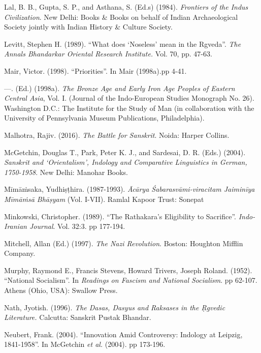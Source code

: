 \begin{thebibliography}{99}
  Lal, B. B., Gupta, S. P., and Asthana, S. (Ed.s) (1984).\textit{ Frontiers of the Indus Civilization}. New Delhi: Books \& Books on behalf of Indian Archaeological Society jointly with Indian History \& Culture Society.

  Levitt, Stephen H. (1989). “What does ‘Noseless’ mean in the Rgveda”. \textit{The Annals Bhandarkar Oriental Research Institute.} Vol. 70, pp. 47-63.

  Mair, Victor. (1998). “Priorities”. In Mair (1998a).pp 4-41.

  —. (Ed.) (1998a). \textit{The Bronze Age and Early Iron Age Peoples of Eastern Central Asia}, Vol. I. (Journal of the Indo-European Studies Monograph No. 26). Washington D.C.: The Institute for the Study of Man (in collaboration with the University of Pennsylvania Museum Publications, Philadelphia).

  Malhotra, Rajiv. (2016). \textit{The Battle for Sanskrit}. Noida: Harper Collins.

  McGetchin, Douglas T., Park, Peter K. J., and Sardesai, D. R. (Eds.) (2004). \textit{Sanskrit and ‘Orientalism’, Indology and Comparative Linguistics in German, 1750-1958}. New Delhi: Manohar Books.

  Mīmāṁsaka, Yudhiṣṭhira. (1987-1993). \textit{Ācārya Śabarasvāmi-viracitam Jaiminīya Mīmāṁsā Bhāṣyam} (Vol. I-VII). Ramlal Kapoor Trust: Sonepat

  Minkowski, Christopher. (1989). “The Rathakara’s Eligibility to Sacrifice”. \textit{Indo-Iranian Journal}. Vol. 32:3. pp 177-194.

  Mitchell, Allan (Ed.) (1997). \textit{The Nazi Revolution}. Boston: Houghton Mifflin Company.

  Murphy, Raymond E., Francis Stevens, Howard Trivers, Joseph Roland. (1952). “National Socialism”. In \textit{Readings on Fascism and National Socialism}. pp 62-107. Athens (Ohio, USA): Swallow Press.

  Nath, Jyotish. (1996). \textit{The Dasas, Dasyus and Raksases in the Ṛgvedic Literature.} Calcutta: Sanskrit Pustak Bhandar.

  Neubert, Frank. (2004). “Innovation Amid Controversy: Indology at Leipzig, 1841-1958”. In McGetchin \textit{et al.} (2004). pp 173-196.


\end{thebibliography}
